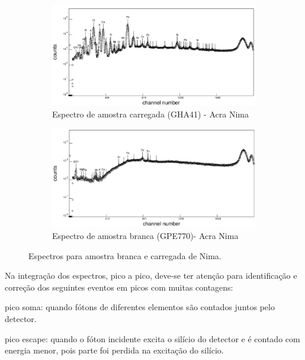 \begin{figure}[H]
  \centering
  \begin{subfigure}[b]{0.7\textwidth}
    \includegraphics[width=\textwidth]{../inputs/images/winqxas/GHA41editado.pdf}
    \caption{Espectro de amostra carregada (GHA41) - Acra Nima}
  \end{subfigure}
  \begin{subfigure}[b]{0.7\textwidth}
    \includegraphics[width=\textwidth]{../inputs/images/winqxas/GPE770editado.pdf}
     \caption{Espectro de amostra branca (GPE770)- Acra Nima}
  \end{subfigure}
  \caption{Espectros para amostra branca e carregada de Nima. \label{fig:winqxas}}
\end{figure}

Na integração dos espectros, pico a pico, deve-se ter atenção 
para identificação e correção dos seguintes eventos em picos com 
muitas contagens: 

\begin{itemize}
  \begin{spacing}{1.0}
  \item pico soma: quando fótons de diferentes elementos são contados
        juntos pelo detector. 
  \item pico escape: quando o fóton incidente excita o silício do detector
        e é contado com energia menor, pois parte foi perdida na excitação 
        do silício. 
  \end{spacing}
\end{itemize}

